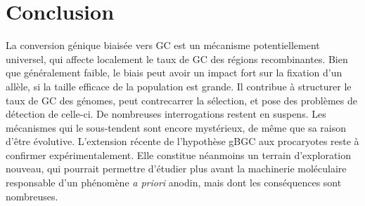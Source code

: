 \documentclass[11pt, oneside]{scrartcl}
\begin{document}
\section*{Conclusion}
\label{sec:orgheadline18}
La conversion génique biaisée vers GC est un mécanisme potentiellement
universel, qui affecte localement le taux de GC des régions recombinantes. Bien
que généralement faible, le biais peut avoir un impact fort sur la fixation d'un
allèle, si la taille efficace de la population est grande. Il contribue à
structurer le taux de GC des génomes, peut contrecarrer la sélection, et pose
des problèmes de détection de celle-ci. De nombreuses interrogations restent en
suspens. Les mécanismes qui le sous-tendent sont encore mystérieux, de même que
sa raison d'être évolutive. L'extension récente de l'hypothèse gBGC aux
procaryotes reste à confirmer expérimentalement. Elle constitue néanmoins un
terrain d'exploration nouveau, qui pourrait permettre d'étudier plus avant la
machinerie moléculaire responsable d'un phénomène \emph{a priori} anodin, mais dont
les conséquences sont nombreuses. 

\end{document}
